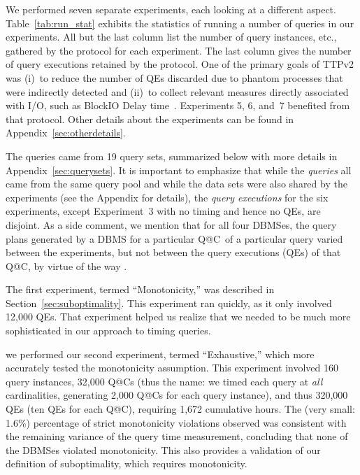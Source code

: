 \documentclass[prodmode,acmtods]{acmsmall}
\makeatletter
\def\QatC{Q{@}C}
\makeatother
\begin{document}
We performed seven separate experiments, each looking at a different
aspect. \hbox{Table~\ref{tab:run_stat}} exhibits the statistics of running a number of 
queries in our experiments. All but the last column list the number of query
instances, etc., gathered by the protocol for each experiment. The last
column gives the number of query executions retained by the protocol. One of
the primary goals of TTPv2 was (i)~to reduce the number of QEs discarded due to
phantom processes that were indirectly detected and (ii)~to collect relevant measures 
directly associated with I/O, such as BlockIO Delay time~\cite{TTPv2}. 
Experiments 5, 6, and~7 benefited from that protocol. Other details about
the experiments can be found in Appendix~\ref{sec:otherdetails}.

The queries came from 19 query sets, summarized below with more details in
\hbox{Appendix~\ref{sec:querysets}}. It is important to emphasize that while the {\em queries} all came
from the same query pool and while the data sets were also shared by the
experiments (see the Appendix for details), the {\em query executions} for
the six experiments, except Experiment~3 with no timing and hence no QEs, 
are disjoint. As a side comment, we mention that for all four \hbox{DBMSes}, the query
plans generated by a \hbox{DBMS} for a particular \QatC\ of a particular query
varied between the experiments, but not between the query executions (QEs)
of that Q@C, by virtue of the way .

The first experiment, termed ``Monotonicity,'' was described in
Section~\ref{sec:suboptimality}. This experiment ran quickly, as it
only involved 12,000 QEs. That experiment helped us realize that we needed
to be much more sophisticated in our approach to timing queries.

 we performed our
second experiment, termed ``Exhaustive,'' which more accurately tested the 
monotonicity assumption. 
This experiment involved 160 query instances, 32,000 \QatC s (thus the name:
we timed each query at {\em all} cardinalities, generating 2,000 \QatC s for
each query instance), and thus
320,000 QEs (ten QEs for each \QatC ), requiring 1,672 cumulative hours.  The (very small: 1.6\%)
percentage %
of strict monotonicity violations observed was consistent with the remaining
variance of the query time measurement, concluding that none of
the \hbox{DBMSes} violated monotonicity. This also provides a validation of
our definition of suboptimality, which requires monotonicity.
\end{document}
